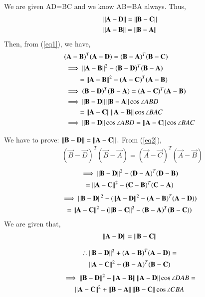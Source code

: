\documentclass[journal,12pt,twocolumn]{IEEEtran}
\begin{document}
We are given AD=BC and we know AB=BA always. Thus, 
\begin{align}
    &\left\lVert\mathbf{A}-\mathbf{D}\right\rVert  =  \left\lVert\mathbf{B}-\mathbf{C}\right\rVert\\
    &\left\lVert\mathbf{A}-\mathbf{B}\right\rVert  =  \left\lVert\mathbf{B}-\mathbf{A}\right\rVert
\end{align}
Then, from (\ref{eq1}), we have,
\begin{align}
& (\mathbf A -\mathbf B)^T(\mathbf{A}-\mathbf{D}) =  (\mathbf B -\mathbf A)^T(\mathbf{B}-\mathbf{C})\\
& \implies \left\lVert\mathbf{A}-\mathbf{B}\right\rVert^2 - (\mathbf B -\mathbf D)^T(\mathbf{B}-\mathbf{A})  \nonumber\\
& \quad\quad=\left\lVert\mathbf{A}-\mathbf{B}\right\rVert^2 - (\mathbf A -\mathbf C)^T(\mathbf{A}-\mathbf{B}) \\
& \implies (\mathbf B -\mathbf D)^T(\mathbf{B}-\mathbf{A}) = (\mathbf A -\mathbf C)^T(\mathbf{A}-\mathbf{B})\label{eq2}\\
& \implies \left\lVert\mathbf{B} - \mathbf{D}\right\rVert\left\lVert\mathbf{B} - \mathbf{A}\right\rVert\cos\angle ABD \nonumber \\
& \quad\quad= \left\lVert\mathbf{A} - \mathbf{C}\right\rVert\left\lVert\mathbf{A} - \mathbf{B}\right\rVert\cos\angle BAC \\
&\implies \left\lVert\mathbf{B} - \mathbf{D}\right\rVert\cos\angle ABD  = \left\lVert\mathbf{A} - \mathbf{C}\right\rVert\cos\angle BAC \label{eq3}
\end{align}

We have to prove: $\left\lVert\mathbf{B} - \mathbf{D}\right\rVert = \left\lVert\mathbf{A} - \mathbf{C}\right\rVert.\\$ 
From (\ref{eq2}),
\begin{align}
	& (\vec{B} -\vec{D})^T(\vec{B}-\vec{A}) = (\vec A -\vec C)^T(\vec{A}-\vec{B})
\end{align}
\begin{multline}
\implies \left\lVert\mathbf{B}-\mathbf{D}\right\rVert^2 - (\mathbf D -\mathbf A)^T(\mathbf{D}-\mathbf{B}) \\
= \left\lVert\mathbf{A}-\mathbf{C}\right\rVert^2 - (\mathbf C -\mathbf B)^T(\mathbf{C}-\mathbf{A})	
\end{multline}
\begin{multline}
\implies \left\lVert\mathbf{B}-\mathbf{D}\right\rVert^2 - (\left\lVert\mathbf{A}-\mathbf{D}\right\rVert^2 - (\mathbf A -\mathbf B)^T(\mathbf A -\mathbf D)) \\
 =\left\lVert\mathbf{A}-\mathbf{C}\right\rVert^2 - (\left\lVert\mathbf{B}-\mathbf{C}\right\rVert^2 - (\mathbf B -\mathbf A)^T(\mathbf B -\mathbf C))\\	
\end{multline}
We are given that,
\begin{align}
	\left\lVert\mathbf{A}-\mathbf{D}\right\rVert =  \left\lVert\mathbf{B}-\mathbf{C}\right\rVert 
\end{align}

\begin{multline}
\therefore \left\lVert\mathbf{B}-\mathbf{D}\right\rVert^2 + (\mathbf A -\mathbf B)^T(\mathbf{A}-\mathbf{D}) = \\ \left\lVert\mathbf{A}-\mathbf{C}\right\rVert^2 + (\mathbf B -\mathbf A)^T(\mathbf{B}-\mathbf{C}) 	
\end{multline}
\begin{multline}
\implies \left\lVert\mathbf{B}-\mathbf{D}\right\rVert^2+ \left\lVert\mathbf{A}-\mathbf{B}\right\rVert\left\lVert\mathbf{A}-\mathbf{D}\right\rVert\cos \angle DAB = \\
 \left\lVert\mathbf{A}-\mathbf{C}\right\rVert^2+\left\lVert\mathbf{B}-\mathbf{A}\right\rVert \left\lVert\mathbf{B}-\mathbf{C}\right\rVert\cos \angle CBA \label{eq4}	
\end{multline}
\end{document}
